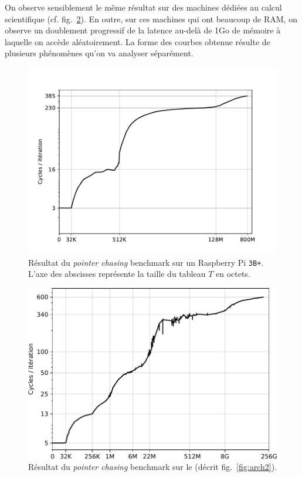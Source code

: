 On observe sensiblement le même résultat sur des machines dédiées au calcul
scientifique (cf. fig.~\ref{fig:chasing_gr20}). En outre, sur ces machines qui
ont beaucoup de RAM, on observe un doublement progressif de la latence au-delà
de 1Go de mémoire à laquelle on accède aléatoirement. La forme des courbes
obtenue résulte de plusieurs phénomènes qu'on va analyser séparément.


\begin{figure}
\includegraphics[width=\textwidth]{cache_curve_pi3b.pdf}
\caption{Résultat du \emph{pointer chasing} benchmark sur un Raspberry Pi
  \texttt{3B+}. L'axe des abscisses représente la taille du tableau $T$ en
  octets. \label{fig:chasing_pi}}
\end{figure}

\begin{figure}
\includegraphics[width=\textwidth]{cache_curve_gr20.pdf}
\caption{Résultat du \emph{pointer chasing} benchmark sur le \og {}\fg (décrit fig.~\ref{fig:arch2}). \label{fig:chasing_gr20}}
\end{figure}


